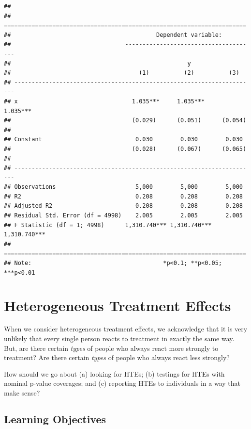 \documentclass[
]{book}
\begin{document}
\begin{verbatim}
## 
## ======================================================================
##                                          Dependent variable:          
##                                 --------------------------------------
##                                                   y                   
##                                     (1)          (2)          (3)     
## ----------------------------------------------------------------------
## x                                 1.035***     1.035***     1.035***  
##                                   (0.029)      (0.051)      (0.054)   
##                                                                       
## Constant                           0.030        0.030        0.030    
##                                   (0.028)      (0.067)      (0.065)   
##                                                                       
## ----------------------------------------------------------------------
## Observations                       5,000        5,000        5,000    
## R2                                 0.208        0.208        0.208    
## Adjusted R2                        0.208        0.208        0.208    
## Residual Std. Error (df = 4998)    2.005        2.005        2.005    
## F Statistic (df = 1; 4998)      1,310.740*** 1,310.740*** 1,310.740***
## ======================================================================
## Note:                                      *p<0.1; **p<0.05; ***p<0.01
\end{verbatim}

\hypertarget{heterogeneous-treatment-effects}{%
\chapter{Heterogeneous Treatment
Effects}\label{heterogeneous-treatment-effects}}

When we consider heterogeneous treatment effects, we acknowledge that it
is very unlikely that every single person reacts to treatment in exactly
the same way. But, are there certain \emph{types} of people who always
react more strongly to treatment? Are there certain \emph{types} of
people who always react less strongly?

How should we go about (a) looking for HTEs; (b) testings for HTEs with
nominal p-value coverages; and (c) reporting HTEs to individuals in a
way that make sense?

\hypertarget{learning-objectives-6}{%
\section{Learning Objectives}\label{learning-objectives-6}}
\end{document}
